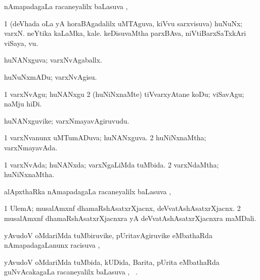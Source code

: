{\bentry
{}
\gl{\uparx}
\expl{}
\bmng
nAmapadagaLa racaneyalilx baLasuva \uparx, \udA\  
\emng
\eentry

\bentry
{} 
\gl{\nA}
\expl{}
\bmng
\bnum
\num{1} (deVhada oLa yA horaBAgadalilx uMTAguva, kiVvu sarxvisuva) huNuNx; varxN. 
\banum
{} neYtika kaLaMka, kale. 
 keDisuvaMtha parxBAva, niVtiBarxSaTxkAri viSaya, \mo vu. 
\eanum
\numie
\enum
\emng
\eentry

\bentry
{} 
\gl{\gu}
\expl{}
\bmng
huNANxguva; varxNvAgaballx. 
\emng
\eentry

\bentry
{} 
\gl{\sakirx}
\expl{}
\bmng
huNuNxmADu; varxNvAgisu. 
\emng

\noindent
\gl{\akirx}
\expl{}
\bmng
\bnum
\num{1} varxNvAgu; huNANxgu 
\num{2} (huNiNxnaMte) tiVvarxyAtane koDu; viSavAgu; naMju hiDi. 
\enum
\emng
\eentry

\bentry
{} 
\gl{\nA}
\expl{}
\bmng
huNANxguvike; varxNmayavAgiruvudu. 
\emng
\eentry

\bentry
{} 
\gl{\gu}
\expl{}
\bmng
\bnum
\num{1} varxNvanunx uMTumADuva; huNANxguva. 
\num{2} huNiNxnaMtha; varxNmayavAda. 
\enum
\emng
\eentry

\bentry
{} 
\gl{\gu}
\expl{}
\bmng
{} 
\emng
\eentry

\bentry
{} 
\gl{\gu}
\expl{}
\bmng
\bnum
\num{1} varxNvAda; huNANxda; varxNgaLiMda tuMbida. 
\num{2} varxNdaMtha; huNiNxnaMtha. 
\enum
\emng
\eentry

\bentry
{}
\gl{\uparx}
\expl{}
\bmng
alApxthaRka nAmapadagaLa racaneyalilx baLasuva \uparx, \udA\  
\emng
\eentry

\bentry
{} 
\gl{\nA}
\expl{}
\bmng
\bnum
\num{1} UlemA; musalAmxnf dhamaRshAsatxrXjacnx, deVvatAshAsatxrXjacnx. 
\num{2} musalAmxnf dhamaRshAsatxrXjacnxra yA deVvatAshAsatxrXjacnxra maMDali. 
\enum
\emng
\eentry

\bentry
{}
\gl{\uparx}
\expl{}
\bmng
yAvudoV oMdariMda tuMbiruvike, pUritavAgiruvike eMbathaRda nAmapadagaLanunx racisuva \uparx, \udA\  
\emng
\eentry

\bentry
{} 
\gl{\uparx}
\expl{}
\bmng
yAvudoV oMdariMda tuMbida, kUDida, Barita, pUrita eMbathaRda guNvAcakagaLa racaneyalilx baLasuva \uparx, \udA\ . 
\emng
\eentry

}
